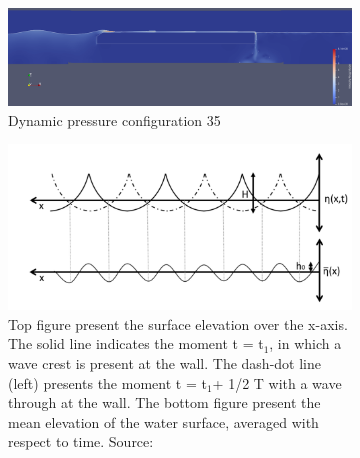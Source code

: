 \begin{figure}[h]
    \centering
    \begin{subfigure}[b]{0.49\textwidth}
        \centering
        \includegraphics[width=\textwidth]{figures/ComFLOW/Results average wl/screenshot_config_35.png}
        \caption[]%
        {{\small Dynamic pressure configuration 35}}    
    \label{fig: dynamic pressure config 35}
    \end{subfigure}
    \hfill
    \begin{subfigure}[b]{0.49\textwidth}   
        \centering 
        \includegraphics[width=\textwidth]{figures/Theory/standingwavepatternstokeswave.PNG}
        \caption[]%
        {{\scriptsize Top figure present the surface elevation
over the x-axis. The solid line indicates the moment t = t$_1$, in which a wave crest is present at the wall. The dash-dot line (left) presents
the moment t = t$_1$+ 1/2 T with a wave through at the wall. The bottom figure present the mean elevation of the water surface, averaged
with respect to time. Source: \citep{maris} }}    
        \label{fig: stokeswavesreflect}
    \end{subfigure}


    \caption{}
    \label{}
\end{figure}











